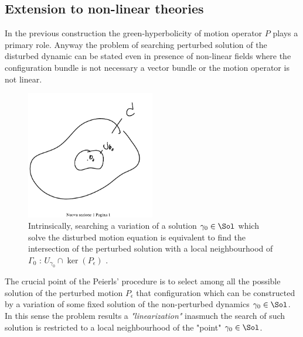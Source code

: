 \documentclass[Main]{subfiles}
\begin{document}
	\subsection{Extension to non-linear theories}
		In the previous construction the green-hyperbolicity of motion operator $P$ plays a primary role.
		Anyway the problem of searching perturbed solution of the disturbed dynamic can be stated even in presence  of non-linear fields  where the configuration bundle is not necessary a vector bundle or the motion operator is not linear.
		\begin{figure}[h!]
				  \centering
			   	\includegraphics[width=0.5\textwidth]{Pictures/Linearization} 
   	  			\caption{Intrinsically, searching a variation of a solution $\gamma_0\in \Sol$ which solve the disturbed motion equation is equivalent to find the intersection of the perturbed solution with a local neighbourhood of $\Gamma_0$ : $U_{\gamma_0}\cap\ker(P_\epsilon)$ .}
		\end{figure}		
		
		The crucial point of the Peierls' procedure  is to select among all the possible solution of the perturbed motion $P_\epsilon$ that configuration which can be constructed by a variation of some fixed solution of the non-perturbed dynamics $\gamma_0 \in \Sol$.
		In this sense the problem results a \emph{"linearization"} inasmuch the  search of such solution is restricted to a local neighbourhood of the "point" $\gamma_0\in \Sol$.
\end{document}
